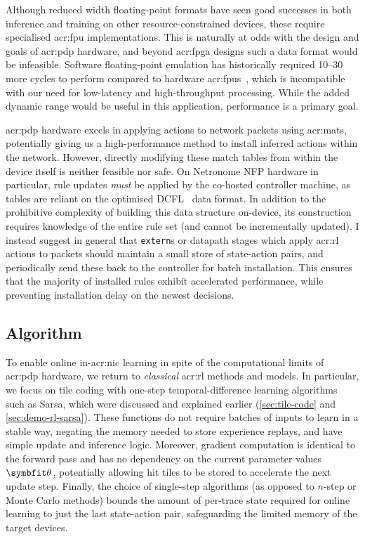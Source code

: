 Although reduced width floating-point formats have seen good successes in both inference and training on other resource-constrained devices, these require specialised \gls{acr:fpu} implementations.
This is naturally at odds with the design and goals of \gls{acr:pdp} hardware, and beyond \gls{acr:fpga} designs such a data format would be infeasible.
Software floating-point emulation has historically required \qtyrange{10}{30}{\times} more cycles to perform compared to hardware \glspl{acr:fpu}~\parencite{DBLP:conf/arith/IordacheT03}, which is incompatible with our need for low-latency and high-throughput processing.
While the added dynamic range would be useful in this application, performance is a primary goal.

\gls{acr:pdp} hardware excels in applying actions to network packets using \glspl{acr:mat}, potentially giving us a high-performance method to install inferred actions within the network.
However, directly modifying these match tables from within the device itself is neither feasible nor safe.
On Netronome NFP hardware in particular, rule updates \emph{must} be applied by the co-hosted controller machine, as tables are reliant on the optimised DCFL~\parencite{DBLP:conf/infocom/TaylorT05} data format.
In addition to the prohibitive complexity of building this data structure on-device, its construction requires knowledge of the entire rule set (and cannot be incrementally updated).
I instead suggest in general that \texttt{extern}s or datapath stages which apply \gls{acr:rl} actions to packets should maintain a small store of state-action pairs, and periodically send these back to the controller for batch installation.
This ensures that the majority of installed rules exhibit accelerated performance, while preventing installation delay on the newest decisions.

\subsection{Algorithm}\label{sec:opal-algorithm}
%
%
%
To enable online in-\gls{acr:nic} learning in spite of the computational limits of \gls{acr:pdp} hardware, we return to \emph{classical} \gls{acr:rl} methods and models.
In particular, we focus on tile coding with one-step temporal-difference learning algorithms such as Sarsa, which were discussed and explained earlier (\cref{sec:tile-code} and \cref{sec:demo-rl-sarsa}).
These functions do not require batches of inputs to learn in a stable way, negating the memory needed to store experience replays, and have simple update and inference logic.
Moreover, gradient computation is identical to the forward pass and has no dependency on the current parameter values $\wvec{}$, potentially allowing hit tiles to be stored to accelerate the next update step.
Finally, the choice of single-step algorithms (as opposed to $n$-step or Monte Carlo methods) bounds the amount of per-trace state required for online learning to just the last state-action pair, safeguarding the limited memory of the target devices.

